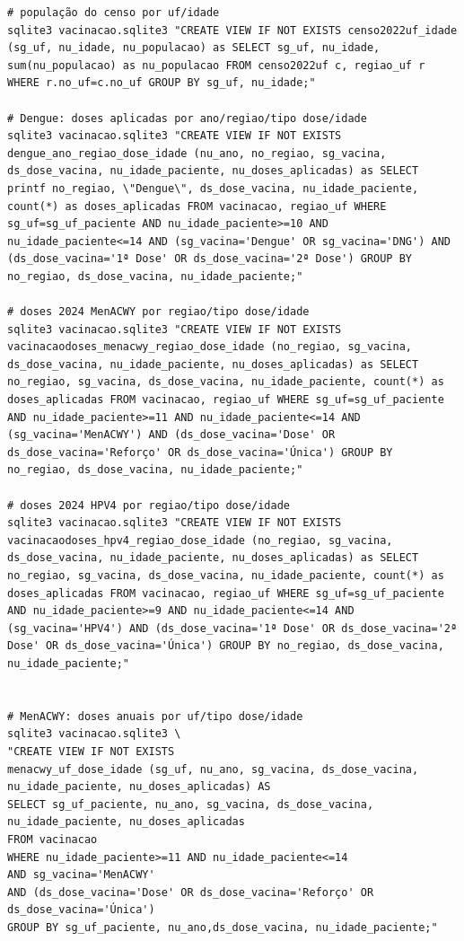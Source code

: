 \documentclass[12pt]{article}
\begin{document}
\begin{verbatim}
# população do censo por uf/idade
sqlite3 vacinacao.sqlite3 "CREATE VIEW IF NOT EXISTS censo2022uf_idade (sg_uf, nu_idade, nu_populacao) as SELECT sg_uf, nu_idade, sum(nu_populacao) as nu_populacao FROM censo2022uf c, regiao_uf r WHERE r.no_uf=c.no_uf GROUP BY sg_uf, nu_idade;"

# Dengue: doses aplicadas por ano/regiao/tipo dose/idade
sqlite3 vacinacao.sqlite3 "CREATE VIEW IF NOT EXISTS dengue_ano_regiao_dose_idade (nu_ano, no_regiao, sg_vacina, ds_dose_vacina, nu_idade_paciente, nu_doses_aplicadas) as SELECT printf no_regiao, \"Dengue\", ds_dose_vacina, nu_idade_paciente, count(*) as doses_aplicadas FROM vacinacao, regiao_uf WHERE sg_uf=sg_uf_paciente AND nu_idade_paciente>=10 AND nu_idade_paciente<=14 AND (sg_vacina='Dengue' OR sg_vacina='DNG') AND (ds_dose_vacina='1ª Dose' OR ds_dose_vacina='2ª Dose') GROUP BY no_regiao, ds_dose_vacina, nu_idade_paciente;"

# doses 2024 MenACWY por regiao/tipo dose/idade
sqlite3 vacinacao.sqlite3 "CREATE VIEW IF NOT EXISTS vacinacaodoses_menacwy_regiao_dose_idade (no_regiao, sg_vacina, ds_dose_vacina, nu_idade_paciente, nu_doses_aplicadas) as SELECT no_regiao, sg_vacina, ds_dose_vacina, nu_idade_paciente, count(*) as doses_aplicadas FROM vacinacao, regiao_uf WHERE sg_uf=sg_uf_paciente AND nu_idade_paciente>=11 AND nu_idade_paciente<=14 AND (sg_vacina='MenACWY') AND (ds_dose_vacina='Dose' OR ds_dose_vacina='Reforço' OR ds_dose_vacina='Única') GROUP BY no_regiao, ds_dose_vacina, nu_idade_paciente;"

# doses 2024 HPV4 por regiao/tipo dose/idade
sqlite3 vacinacao.sqlite3 "CREATE VIEW IF NOT EXISTS vacinacaodoses_hpv4_regiao_dose_idade (no_regiao, sg_vacina, ds_dose_vacina, nu_idade_paciente, nu_doses_aplicadas) as SELECT no_regiao, sg_vacina, ds_dose_vacina, nu_idade_paciente, count(*) as doses_aplicadas FROM vacinacao, regiao_uf WHERE sg_uf=sg_uf_paciente AND nu_idade_paciente>=9 AND nu_idade_paciente<=14 AND (sg_vacina='HPV4') AND (ds_dose_vacina='1ª Dose' OR ds_dose_vacina='2ª Dose' OR ds_dose_vacina='Única') GROUP BY no_regiao, ds_dose_vacina, nu_idade_paciente;"


# MenACWY: doses anuais por uf/tipo dose/idade
sqlite3 vacinacao.sqlite3 \
"CREATE VIEW IF NOT EXISTS
menacwy_uf_dose_idade (sg_uf, nu_ano, sg_vacina, ds_dose_vacina, nu_idade_paciente, nu_doses_aplicadas) AS
SELECT sg_uf_paciente, nu_ano, sg_vacina, ds_dose_vacina, nu_idade_paciente, nu_doses_aplicadas
FROM vacinacao
WHERE nu_idade_paciente>=11 AND nu_idade_paciente<=14
AND sg_vacina='MenACWY'
AND (ds_dose_vacina='Dose' OR ds_dose_vacina='Reforço' OR ds_dose_vacina='Única')
GROUP BY sg_uf_paciente, nu_ano,ds_dose_vacina, nu_idade_paciente;"


\end{verbatim}
\end{document}
